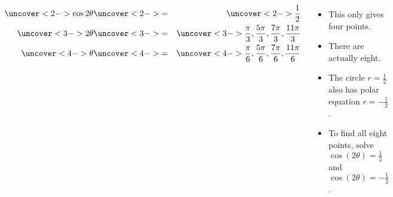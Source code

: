 \begin{frame}
\begin{example}
\begin{columns}[c]
\abovedisplayskip=0pt
\belowdisplayskip=0pt
\begin{eqnarray*}
\uncover<2->{%
\cos 2\theta%
}%
& \uncover<2->{ = } &%
\uncover<2->{%
\frac{1}{2}%
}\\%
\uncover<3->{%
2\theta%
}%
& \uncover<3->{ = } &%
\uncover<3->{%
\frac{\pi}{3}, \frac{5\pi}{3}, \frac{7\pi}{3}, \frac{11\pi}{3}%
}\\%
\uncover<4->{%
\theta%
}%
& \uncover<4->{ = } &%
\uncover<4->{%
\frac{\pi}{6}, \frac{5\pi}{6}, \frac{7\pi}{6}, \frac{11\pi}{6}%
}%
\end{eqnarray*}
\begin{itemize}
\item<5->  This only gives four points.
\item<6->  There are actually eight.
\item<7->  The circle $r = \frac{1}{2}$ also has polar equation $r = -\frac{1}{2}$.
\item<8->  To find all eight points, solve \alert<handout:0| 9>{$\cos (2\theta )= \frac{1}{2}$} and \alert<handout:0| 10>{$\cos (2\theta) = -\frac{1}{2}$}.
\end{itemize}
\end{columns}
\end{example}
\end{frame}
